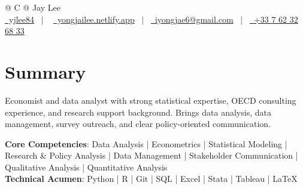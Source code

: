 \documentclass[a4paper,12pt]{article}
\begin{document}
\pagestyle{empty} 



\begin{tabularx}{\linewidth}{@{} C @{}}
\Huge{Jay Lee} \\[7.5pt]
\href{https://github.com/yjlee84}{\raisebox{-0.05\height}\faGithub\ yjlee84} \ $|$ \ 
\href{https://yongjailee.netlify.app}{\raisebox{-0.05\height}\faGlobe \ yongjailee.netlify.app} \ $|$ \ 
\href{mailto:email@mysite.com}{\raisebox{-0.05\height}\faEnvelope \ iyongjae6@gmail.com} \ $|$ \ 
\href{tel:+000000000000}{\raisebox{-0.05\height}\faMobile \ +33 7 62 32 68 33} \\
\end{tabularx}


\section{Summary}
Economist and data analyst with strong statistical expertise, OECD consulting experience, and research support background. Brings data analysis, data management, survey outreach, and clear policy-oriented communication.

\textbf{Core Competencies}: Data Analysis | Econometrics | Statistical Modeling | Research \& Policy Analysis | Data Management | Stakeholder Communication | Qualitative Analysis | Quantitative Analysis\\
\textbf{Technical Acumen}: Python | R | Git | SQL | Excel | Stata | Tableau | \LaTeX{}
\end{document}
